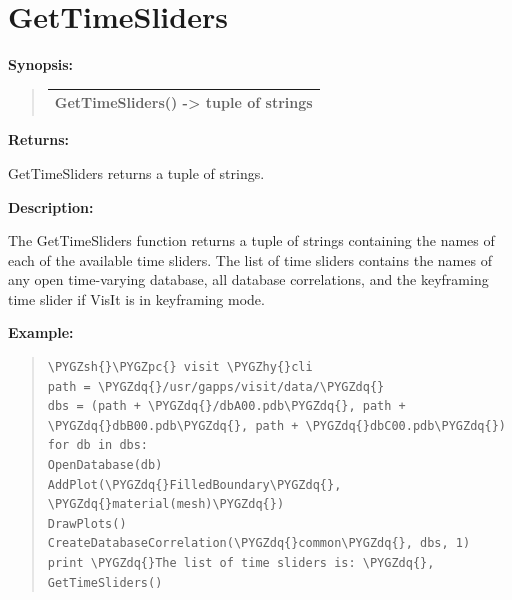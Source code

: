 \documentclass[letterpaper,10pt,english]{sphinxmanual}
\def\PYGZsh{\char`\#}
\def\PYGZpc{\char`\%}
\def\PYGZhy{\char`\-}
\def\PYGZdq{\char`\"}
\begin{document}
\section{GetTimeSliders}
\label{functions:gettimesliders}
\begin{DUlineblock}{0em}
\item[] \textbf{Synopsis:}
\end{DUlineblock}
\begin{quote}

\begin{tabulary}{\linewidth}{|L|}
\hline

GetTimeSliders() -\textgreater{} tuple of strings
\\
\hline\end{tabulary}

\end{quote}

\begin{DUlineblock}{0em}
\item[] 
\item[] \textbf{Returns:}
\item[] GetTimeSliders returns a tuple of strings.
\item[] 
\item[] \textbf{Description:}
\item[] The GetTimeSliders function returns a tuple of strings containing the
names of each of the available time sliders. The list of time sliders
contains the names of any open time-varying database, all database
correlations, and the keyframing time slider if VisIt is in keyframing mode.
\end{DUlineblock}

\begin{DUlineblock}{0em}
\item[] 
\end{DUlineblock}

\begin{DUlineblock}{0em}
\item[] \textbf{Example:}
\item[] 
\end{DUlineblock}
\begin{quote}

\begin{Verbatim}[commandchars=\\\{\}]
\PYGZsh{}\PYGZpc{} visit \PYGZhy{}cli
path = \PYGZdq{}/usr/gapps/visit/data/\PYGZdq{}
dbs = (path + \PYGZdq{}/dbA00.pdb\PYGZdq{}, path + \PYGZdq{}dbB00.pdb\PYGZdq{}, path + \PYGZdq{}dbC00.pdb\PYGZdq{})
for db in dbs:
OpenDatabase(db)
AddPlot(\PYGZdq{}FilledBoundary\PYGZdq{}, \PYGZdq{}material(mesh)\PYGZdq{})
DrawPlots()
CreateDatabaseCorrelation(\PYGZdq{}common\PYGZdq{}, dbs, 1)
print \PYGZdq{}The list of time sliders is: \PYGZdq{}, GetTimeSliders()
\end{Verbatim}
\end{quote}
\end{document}
